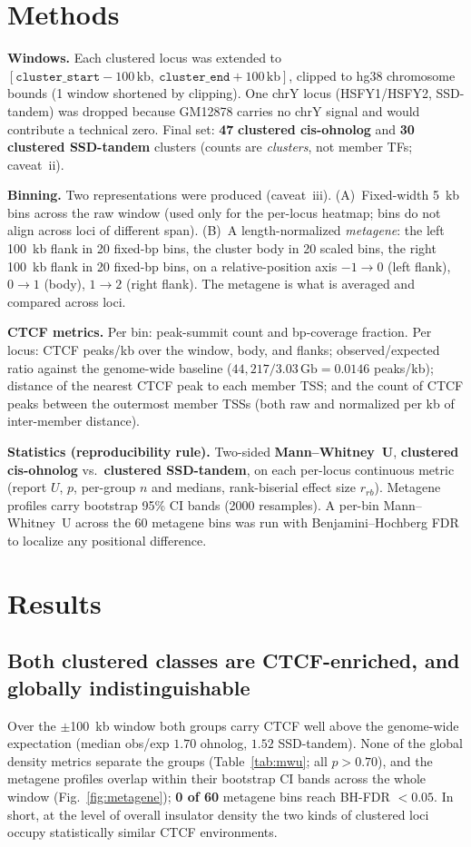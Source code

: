 \documentclass[11pt]{article}
\newcommand{\ohno}{\textcolor{ohno}{\textbf{clustered cis-ohnolog}}}
\newcommand{\ssd}{\textcolor{ssd}{\textbf{clustered SSD-tandem}}}
\begin{document}
\section{Methods}
\textbf{Windows.} Each clustered locus was extended to
$[\texttt{cluster\_start}-100\,\text{kb},\ \texttt{cluster\_end}+100\,\text{kb}]$, clipped
to hg38 chromosome bounds (1 window shortened by clipping). One chrY locus (HSFY1/HSFY2,
SSD-tandem) was dropped because GM12878 carries no chrY signal and would contribute a
technical zero. Final set: \textbf{47} \ohno{} and \textbf{30} \ssd{} clusters (counts are
\emph{clusters}, not member TFs; caveat~ii).

\textbf{Binning.} Two representations were produced (caveat~iii). (A)~Fixed-width 5~kb bins
across the raw window (used only for the per-locus heatmap; bins do not align across loci of
different span). (B)~A length-normalized \emph{metagene}: the left 100~kb flank in 20
fixed-bp bins, the cluster body in 20 scaled bins, the right 100~kb flank in 20 fixed-bp
bins, on a relative-position axis $-1\!\to\!0$ (left flank), $0\!\to\!1$ (body),
$1\!\to\!2$ (right flank). The metagene is what is averaged and compared across loci.

\textbf{CTCF metrics.} Per bin: peak-summit count and bp-coverage fraction. Per locus:
CTCF peaks/kb over the window, body, and flanks; observed/expected ratio against the
genome-wide baseline ($44{,}217/3.03\,\text{Gb}=0.0146$ peaks/kb); distance of the nearest
CTCF peak to each member TSS; and the count of CTCF peaks between the outermost member TSSs
(both raw and normalized per kb of inter-member distance).

\textbf{Statistics (reproducibility rule).} Two-sided \textbf{Mann--Whitney~U},
\ohno{} vs.\ \ssd{}, on each per-locus continuous metric (report $U$, $p$, per-group $n$ and
medians, rank-biserial effect size $r_{rb}$). Metagene profiles carry bootstrap 95\% CI
bands (2000 resamples). A per-bin Mann--Whitney~U across the 60 metagene bins was run with
Benjamini--Hochberg FDR to localize any positional difference.

\section{Results}

\subsection*{Both clustered classes are CTCF-enriched, and globally indistinguishable}
Over the $\pm$100~kb window both groups carry CTCF well above the genome-wide expectation
(median obs/exp $1.70$ ohnolog, $1.52$ SSD-tandem). None of the global density metrics
separate the groups (Table~\ref{tab:mwu}; all $p>0.70$), and the metagene profiles overlap
within their bootstrap CI bands across the whole window (Fig.~\ref{fig:metagene}); \textbf{0
of 60} metagene bins reach BH-FDR $<0.05$. In short, at the level of overall insulator
density the two kinds of clustered loci occupy statistically similar CTCF environments.
\end{document}
